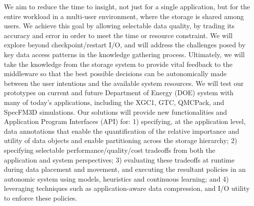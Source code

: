 We aim to reduce the time to insight, not just for a single
application, but for the entire workload in a multi-user environment, where
the storage is shared among users.
We achieve this goal by allowing selectable data quality, by trading its accuracy and error
in order to meet the time or resource constraint. 
We will explore beyond 
checkpoint/restart I/O, and will address the challenges posed by 
key
data access patterns in the knowledge gathering process.
Ultimately, we will take the knowledge from the storage system to provide vital feedback to the middleware 
so that the best possible decisions can be autonomically made between the user intentions and
the available system resources.  
We will test our prototypes  on current and future Department of Energy (DOE) system with many of today's applications, including the
XGC1, GTC, QMCPack, and SpecFM3D simulations. 
Our solutions will provide  new functionalities and Application Program Interfaces (API) for:
1) specifying, at the application level, data annotations that enable the
quantification of the relative importance and utility of data objects and
enable partitioning  across the storage hierarchy;
2) specifying selectable performance/quality/cost tradeoffs from both the
application and system perspectives;
3) evaluating these tradeoffs at runtime during data placement and movement,
and executing the resultant policies in an autonomic system using models,
heuristics and continuous learning; and
4) leveraging techniques such as application-aware data compression, 
and  I/O utility to enforce these
policies.
\noindent

\vfill
